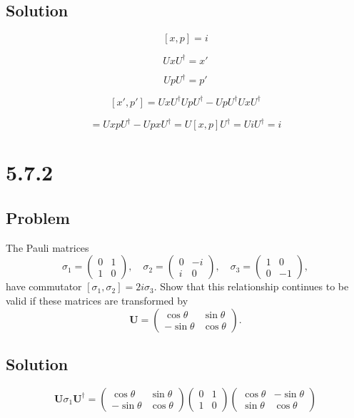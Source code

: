 \documentclass[12pt]{article}
\begin{document}
\subsection{Solution}

\[
    [x, p] = i
\]

\[
    U x U^\dagger = x'
\]

\[
    U p U^\dagger = p'
\]

\[
    [x', p'] =U x U^\dagger U p U^\dagger - U p U^\dagger U x U^\dagger
\]

\[
    = U x p U^\dagger - U p x U^\dagger = U [x, p] U^\dagger = U i U^\dagger = i
\]

\newpage
\section{5.7.2}

\subsection{Problem}

The Pauli matrices
\[
    \sigma_1=\left(\begin{array}{ll}
            0 & 1 \\
            1 & 0
        \end{array}\right), \quad \sigma_2=\left(\begin{array}{cc}
            0 & -i \\
            i & 0
        \end{array}\right), \quad \sigma_3=\left(\begin{array}{rr}
            1 & 0  \\
            0 & -1
        \end{array}\right),
\]
have commutator \(\left[\sigma_1, \sigma_2\right]=2 i \sigma_3\). Show that this relationship continues to be valid if these matrices are transformed by
\[
    \mathbf{U}=\left(\begin{array}{rr}
            \cos \theta  & \sin \theta \\
            -\sin \theta & \cos \theta
        \end{array}\right) .
\]

\subsection{Solution}

\[
    \mathbf{U}\sigma_1\mathbf{U^\dagger} =
    \begin{pmatrix}
        \cos \theta  & \sin \theta \\
        -\sin \theta & \cos \theta
    \end{pmatrix}
    \begin{pmatrix}
        0 & 1 \\
        1 & 0
    \end{pmatrix}
    \begin{pmatrix}
        \cos \theta & -\sin \theta \\
        \sin \theta & \cos \theta
    \end{pmatrix}
\]
\end{document}
